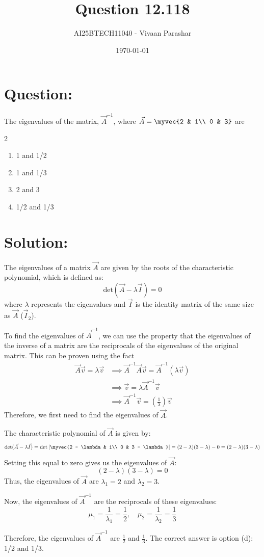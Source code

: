 \documentclass[a4paper, 12pt]{article}
\title{Question 12.118}
\author{AI25BTECH11040 - Vivaan Parashar}
\date{\today}
\begin{document}
\maketitle

\section{Question: }
The eigenvalues of the matrix, $\vec{A}^{-1}$, where $\vec{A} = \myvec{2 & 1\\ 0 & 3}$ are
\begin{multicols}{2}
    \begin{enumerate}[label=\alph*)]
        \item 1 and 1/2
        \item 1 and 1/3
        \item 2 and 3
        \item 1/2 and 1/3
    \end{enumerate}
\end{multicols}

\section{Solution: }
The eigenvalues of a matrix $\vec{A}$ are given by the roots of the characteristic polynomial, which is defined as:
\[\text{det}(\vec{A} - \lambda \vec{I}) = 0\]
where $\lambda$ represents the eigenvalues and $\vec{I}$ is the identity matrix of the same size as $\vec{A}$ ($\vec{I}_2$).

To find the eigenvalues of $\vec{A}^{-1}$, we can use the property that the eigenvalues of the inverse of a matrix are the reciprocals of the eigenvalues of the original matrix.
This can be proven using the fact
\begin{align*}
\vec{A}\vec{v} = \lambda \vec{v} &\implies \vec{A}^{-1}\vec{A}\vec{v} = \vec{A}^{-1}(\lambda \vec{v}) \\
&\implies \vec{v} = \lambda \vec{A}^{-1}\vec{v} \\
&\implies \vec{A}^{-1}\vec{v} = \left(\frac{1}{\lambda}\right) \vec{v}
\end{align*}
Therefore, we first need to find the eigenvalues of $\vec{A}$.

The characteristic polynomial of $\vec{A}$ is given by:
\[\text{det}(\vec{A} - \lambda \vec{I}) = \text{det}\left|\myvec{2 - \lambda & 1\\ 0 & 3 - \lambda}\right| = (2 - \lambda)(3 - \lambda) - 0 = (2 - \lambda)(3 - \lambda)\]
Setting this equal to zero gives us the eigenvalues of $\vec{A}$:
\[(2 - \lambda)(3 - \lambda) = 0\]
Thus, the eigenvalues of $\vec{A}$ are $\lambda_1 = 2$ and $\lambda_2 = 3$.

Now, the eigenvalues of $\vec{A}^{-1}$ are the reciprocals of these eigenvalues:
\[\mu_1 = \frac{1}{\lambda_1} = \frac{1}{2}, \quad \mu_2 = \frac{1}{\lambda_2} = \frac{1}{3}\]

Therefore, the eigenvalues of $\vec{A}^{-1}$ are $\frac{1}{2}$ and $\frac{1}{3}$.
The correct answer is option (d): 1/2 and 1/3.
\end{document}
